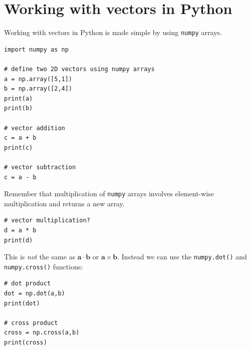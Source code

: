 \documentclass[a4paper]{article}
\renewcommand{\vec}[1]{\mathbf{#1}}
\begin{document}
\section{Working with vectors in Python}
Working with vectors in Python is made simple by using \texttt{numpy} arrays.
\begin{lstlisting}
import numpy as np

# define two 2D vectors using numpy arrays
a = np.array([5,1])
b = np.array([2,4])
print(a)
print(b)

# vector addition
c = a + b
print(c)

# vector subtraction
c = a - b
\end{lstlisting}
Remember that multiplication of \texttt{numpy} arrays involves element-wise multiplication and returns a new array.
\begin{lstlisting}
# vector multiplication?
d = a * b
print(d)
\end{lstlisting}
This is \emph{not} the same as $\vec{a}\cdot\vec{b}$ or $\vec{a}\times\vec{b}$. Instead we can use the \texttt{numpy.dot()} and \texttt{numpy.cross()} functions:
\begin{lstlisting}
# dot product
dot = np.dot(a,b)
print(dot)

# cross product
cross = np.cross(a,b)
print(cross)
\end{lstlisting}

\vspace{\baselineskip}
\begin{center}
  \noindent{}
\end{center}


%
%
\end{document}

